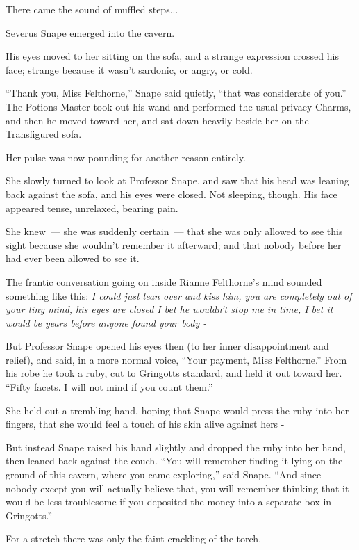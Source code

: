 There came the sound of muffled steps...

Severus Snape emerged into the cavern.

His eyes moved to her sitting on the sofa, and a strange expression crossed his face; strange because it wasn't sardonic, or angry, or cold.

``Thank you, Miss Felthorne,'' Snape said quietly, ``that was considerate of you.'' The Potions Master took out his wand and performed the usual privacy Charms, and then he moved toward her, and sat down heavily beside her on the Transfigured sofa.

Her pulse was now pounding for another reason entirely.

She slowly turned to look at Professor Snape, and saw that his head was leaning back against the sofa, and his eyes were closed. Not sleeping, though. His face appeared tense, unrelaxed, bearing pain.

She knew~--- she was suddenly certain~--- that she was only allowed to see this sight because she wouldn't remember it afterward; and that nobody before her had ever been allowed to see it.

The frantic conversation going on inside Rianne Felthorne's mind sounded something like this: \emph{I could just lean over and kiss him, you are completely out of your tiny mind, his eyes are closed I bet he wouldn't stop me in time, I bet it would be years before anyone found your body -}

But Professor Snape opened his eyes then (to her inner disappointment and relief), and said, in a more normal voice, ``Your payment, Miss Felthorne.'' From his robe he took a ruby, cut to Gringotts standard, and held it out toward her. ``Fifty facets. I will not mind if you count them.''

She held out a trembling hand, hoping that Snape would press the ruby into her fingers, that she would feel a touch of his skin alive against hers -

But instead Snape raised his hand slightly and dropped the ruby into her hand, then leaned back against the couch. ``You will remember finding it lying on the ground of this cavern, where you came exploring,'' said Snape. ``And since nobody except you will actually believe that, you will remember thinking that it would be less troublesome if you deposited the money into a separate box in Gringotts.''

For a stretch there was only the faint crackling of the torch.


